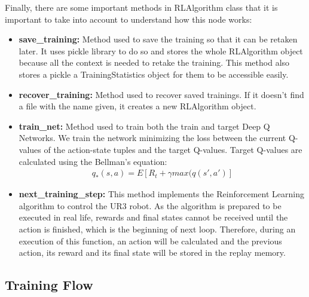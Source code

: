 				Finally, there are some important methods in RLAlgorithm class that it is important to take into account to understand how this node works:
				
				\begin{itemize}
					\item[\textendash]\textbf{save\_training:} Method used to save the training so that it can be retaken later. It uses pickle library to do so and stores the whole RLAlgorithm object because all the context is needed to retake the training. This method also stores a pickle a TrainingStatistics object for them to be accessible easily.
					\item[\textendash]\textbf{recover\_training:} Method used to recover saved trainings. If it doesn't find a file with the name given, it creates a new RLAlgorithm object.
					\item[\textendash]\textbf{train\_net:} Method used to train both the train and target Deep Q Networks. We train the network minimizing the loss between the current Q-values of the action-state tuples and the target Q-values. Target Q-values are calculated using the Bellman's equation:
					\begin{gather*}
						q_*(s,a) = E[ R_t + \gamma max(q(s', a' )]
					\end{gather*}
					\item[\textendash]\textbf{next\_training\_step:} This method implements the Reinforcement Learning algorithm to control the UR3 robot. As the algorithm is prepared to be executed in real life, rewards and final states cannot be received until the action is finished, which is the beginning of next loop. Therefore, during an execution of this function, an action will be calculated and the previous action, its reward and its final state will be stored in the replay memory.
				\end{itemize}
			
			\subsection{Training Flow}
			
				